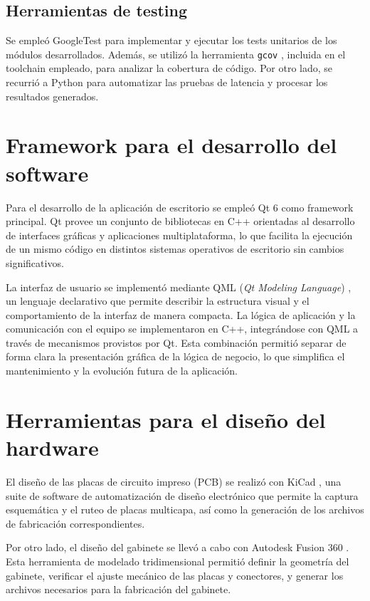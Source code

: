 \subsection{Herramientas de testing}
Se empleó GoogleTest \cite{googletest} para implementar y ejecutar los tests unitarios de los módulos desarrollados. Además, se utilizó la herramienta \texttt{gcov} \cite{gcc:gcov}, incluida en el toolchain empleado, para analizar la cobertura de código. Por otro lado, se recurrió a Python \cite{python} para automatizar las pruebas de latencia y procesar los resultados generados.



\section{Framework para el desarrollo del software}

Para el desarrollo de la aplicación de escritorio se empleó Qt 6 \cite{qt:qt6} como framework principal. Qt provee un conjunto de bibliotecas en C++ orientadas al desarrollo de interfaces gráficas y aplicaciones multiplataforma, lo que facilita la ejecución de un mismo código en distintos sistemas operativos de escritorio sin cambios significativos.

La interfaz de usuario se implementó mediante QML (\textit{Qt Modeling Language}) \cite{qt:qml}, un lenguaje declarativo que permite describir la estructura visual y el comportamiento de la interfaz de manera compacta. La lógica de aplicación y la comunicación con el equipo se implementaron en C++, integrándose con QML a través de mecanismos provistos por Qt. Esta combinación permitió separar de forma clara la presentación gráfica de la lógica de negocio, lo que simplifica el mantenimiento y la evolución futura de la aplicación.


\section{Herramientas para el diseño del hardware}

El diseño de las placas de circuito impreso (PCB) se realizó con KiCad \cite{kicad:eda}, una suite de software de automatización de diseño electrónico que permite la captura esquemática y el ruteo de placas multicapa, así como la generación de los archivos de fabricación correspondientes.

Por otro lado, el diseño del gabinete se llevó a cabo con Autodesk Fusion 360 \cite{autodesk:fusion360}. Esta herramienta de modelado tridimensional permitió definir la geometría del gabinete, verificar el ajuste mecánico de las placas y conectores, y generar los archivos necesarios para la fabricación del gabinete.

